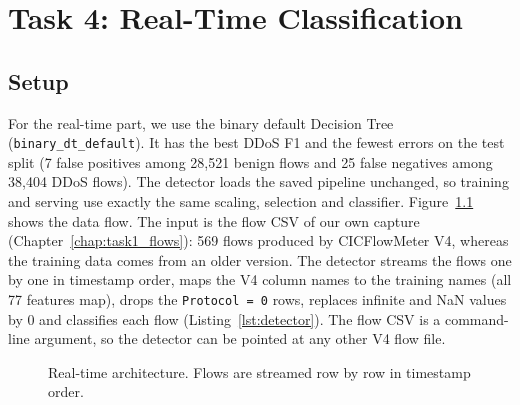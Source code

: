 \chapter{Task 4: Real-Time Classification}\label{chap:task4_realtime}

\section{Setup}\label{sec:realtime-setup}

For the real-time part, we use the binary default Decision Tree (\texttt{binary\_dt\_default}). It has the best DDoS F1 and the fewest errors on the test split (7 false positives among 28,521 benign flows and 25 false negatives among 38,404 DDoS flows). The detector loads the saved pipeline unchanged, so training and serving use exactly the same scaling, selection and classifier. Figure~\ref{fig:arch} shows the data flow. The input is the flow CSV of our own capture (Chapter~\ref{chap:task1_flows}): 569 flows produced by CICFlowMeter V4, whereas the training data comes from an older version. The detector streams the flows one by one in timestamp order, maps the V4 column names to the training names (all 77 features map), drops the \texttt{Protocol = 0} rows, replaces infinite and NaN values by 0 and classifies each flow (Listing~\ref{lst:detector}). The flow CSV is a command-line argument, so the detector can be pointed at any other V4 flow file.

\begin{figure}[ht]
	\centering
	\caption{Real-time architecture. Flows are streamed row by row in timestamp order.}
	\label{fig:arch}
\end{figure}

